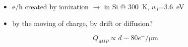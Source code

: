 \begin{frame}
\begin{itemize}
                \item e/h created by ionization $\rightarrow$ in Si @ \SI{300}{K}, $w_{i}$=\SI{3.6}{eV}
                \item by the moving of charge, by drift or diffusion? 
            \end{itemize}
            \bigskip
            \begin{equation*}%
                Q_{MIP}\propto d \sim 80 e^-/\si{\um}
            \end{equation*} 


    \end{frame} 

